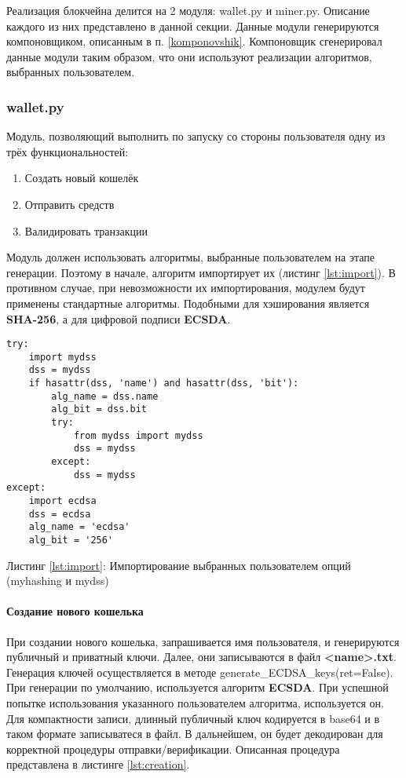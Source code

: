Реализация блокчейна делится на 2 модуля: {\small wallet.py} и {\small
miner.py}. Описание каждого из них представлено в данной секции.
Данные модули генерируются компоновщиком, описанным в п. \ref{komponovshik}.
Компоновщик сгенерировал данные модули таким образом, что они используют
реализации алгоритмов, выбранных пользователем.

\subsubsection{wallet.py}
Модуль, позволяющий выполнить по запуску со стороны пользователя одну из трёх
функциональностей:

\begin{enumerate}
    \item Создать новый кошелёк
    \item Отправить средств
    \item Валидировать транзакции
\end{enumerate}


Модуль должен использовать алгоритмы, выбранные пользователем на этапе
генерации. Поэтому в начале, алгоритм импортирует их (листинг
\ref{lst:import}). В противном случае, при невозможности их импортирования,
модулем будут применены стандартные алгоритмы.  Подобными для хэширования
является \textbf{SHA-256}, а для цифровой подписи \textbf{ECSDA}. 

\begin{center}
\begin{lstlisting}
try:
    import mydss
    dss = mydss
    if hasattr(dss, 'name') and hasattr(dss, 'bit'):
        alg_name = dss.name
        alg_bit = dss.bit
        try:
            from mydss import mydss
            dss = mydss
        except:
            dss = mydss
except:
    import ecdsa
    dss = ecdsa
    alg_name = 'ecdsa'
    alg_bit = '256'
\end{lstlisting}\label{lst:import}
    Листинг \ref{lst:import}: Импортирование выбранных пользователем опций (myhashing и mydss)
\end{center}

\paragraph{Создание нового кошелька}
При создании нового кошелька, запрашивается имя пользователя, и генерируются
публичный и приватный ключи. Далее, они записываются в файл
\textbf{<name>.txt}.  Генерация ключей осуществляется в методе {\small
generate\_ECDSA\_keys(ret=False)}.  При генерации по умолчанию, используется
алгоритм \textbf{ECSDA}. При успешной попытке использования указанного
пользователем алгоритма, используется он. Для компактности записи, длинный
публичный ключ кодируется в base64 и в таком формате записыватеся в файл. В
дальнейшем, он будет декодирован для корректной процедуры отправки/верификации.
Описанная процедура представлена в листинге \ref{lst:creation}.

